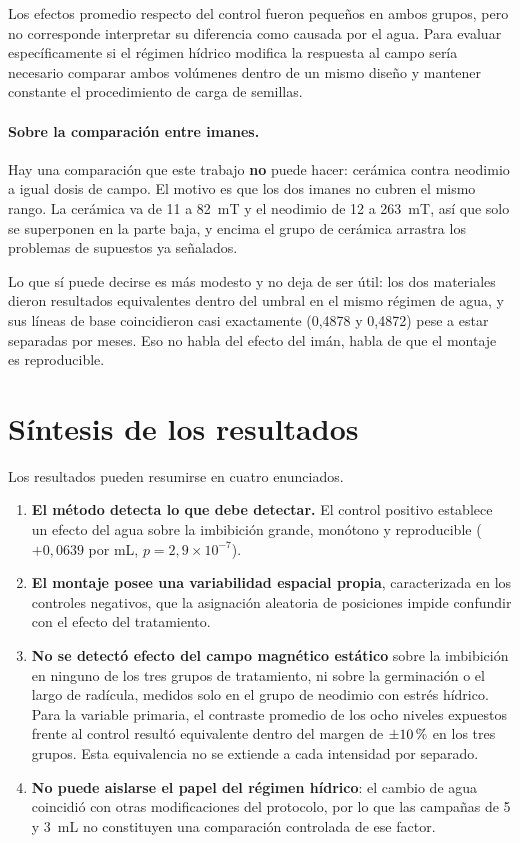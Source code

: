 Los efectos promedio respecto del control fueron pequeños en ambos grupos, pero no corresponde interpretar su diferencia como causada por el agua. Para evaluar específicamente si el régimen hídrico modifica la respuesta al campo sería necesario comparar ambos volúmenes dentro de un mismo diseño y mantener constante el procedimiento de carga de semillas.

\paragraph{Sobre la comparación entre imanes.}

Hay una comparación que este trabajo \textbf{no} puede hacer: cerámica contra neodimio a igual dosis de campo. El motivo es que los dos imanes no cubren el mismo rango. La cerámica va de 11 a 82~mT y el neodimio de 12 a 263~mT, así que solo se superponen en la parte baja, y encima el grupo de cerámica arrastra los problemas de supuestos ya señalados.

Lo que sí puede decirse es más modesto y no deja de ser útil: los dos materiales dieron resultados equivalentes dentro del umbral en el mismo régimen de agua, y sus líneas de base coincidieron casi exactamente (0,4878 y 0,4872) pese a estar separadas por meses. Eso no habla del efecto del imán, habla de que el montaje es reproducible.

\section{Síntesis de los resultados}

Los resultados pueden resumirse en cuatro enunciados.

\begin{enumerate}
    \item \textbf{El método detecta lo que debe detectar.} El control positivo establece un efecto del agua sobre la imbibición grande, monótono y reproducible (\(+0{,}0639\) por mL, \(p = 2{,}9 \times 10^{-7}\)).
    \item \textbf{El montaje posee una variabilidad espacial propia}, caracterizada en los controles negativos, que la asignación aleatoria de posiciones impide confundir con el efecto del tratamiento.
    \item \textbf{No se detectó efecto del campo magnético estático} sobre la imbibición en ninguno de los tres grupos de tratamiento, ni sobre la germinación o el largo de radícula, medidos solo en el grupo de neodimio con estrés hídrico. Para la variable primaria, el contraste promedio de los ocho niveles expuestos frente al control resultó equivalente dentro del margen de \(\pm 10\,\text{\%}\) en los tres grupos. Esta equivalencia no se extiende a cada intensidad por separado.
    \item \textbf{No puede aislarse el papel del régimen hídrico}: el cambio de agua coincidió con otras modificaciones del protocolo, por lo que las campañas de 5 y 3~mL no constituyen una comparación controlada de ese factor.
\end{enumerate}
